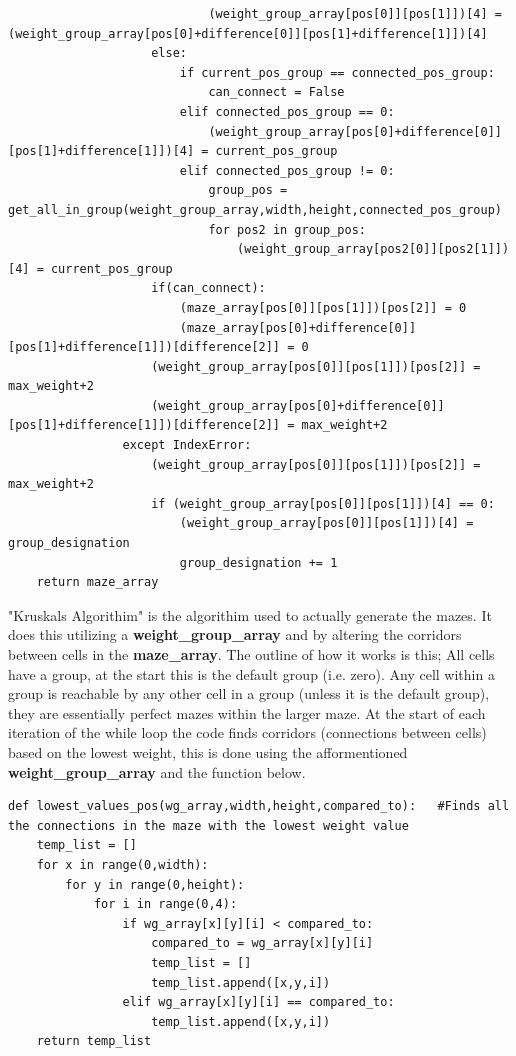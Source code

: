 \documentclass{article}
\begin{document}
\begin{lstlisting}
                            (weight_group_array[pos[0]][pos[1]])[4] = (weight_group_array[pos[0]+difference[0]][pos[1]+difference[1]])[4]
                    else:
                        if current_pos_group == connected_pos_group:
                            can_connect = False
                        elif connected_pos_group == 0:
                            (weight_group_array[pos[0]+difference[0]][pos[1]+difference[1]])[4] = current_pos_group
                        elif connected_pos_group != 0:
                            group_pos = get_all_in_group(weight_group_array,width,height,connected_pos_group)
                            for pos2 in group_pos:
                                (weight_group_array[pos2[0]][pos2[1]])[4] = current_pos_group
                    if(can_connect):
                        (maze_array[pos[0]][pos[1]])[pos[2]] = 0
                        (maze_array[pos[0]+difference[0]][pos[1]+difference[1]])[difference[2]] = 0
                    (weight_group_array[pos[0]][pos[1]])[pos[2]] = max_weight+2
                    (weight_group_array[pos[0]+difference[0]][pos[1]+difference[1]])[difference[2]] = max_weight+2
                except IndexError:
                    (weight_group_array[pos[0]][pos[1]])[pos[2]] = max_weight+2
                    if (weight_group_array[pos[0]][pos[1]])[4] == 0:
                        (weight_group_array[pos[0]][pos[1]])[4] = group_designation
                        group_designation += 1
    return maze_array
\end{lstlisting}
"Kruskals Algorithim" is the algorithim used to actually generate the mazes. It does this utilizing a \textbf{weight\_group\_array} and by altering
the corridors between cells in the \textbf{maze\_array}. The outline of how it works is this; All cells have a group, at the start this is the default group (i.e. zero).
Any cell within a group is reachable by any other cell in a group (unless it is the default group), they are essentially perfect mazes within the larger maze.
At the start of each iteration of the while loop the code finds corridors (connections between cells) based on the lowest weight, this is done using the afformentioned
\textbf{weight\_group\_array} and the function below.
\clearpage
\begin{lstlisting}
def lowest_values_pos(wg_array,width,height,compared_to):   #Finds all the connections in the maze with the lowest weight value
    temp_list = []
    for x in range(0,width):
        for y in range(0,height):
            for i in range(0,4):
                if wg_array[x][y][i] < compared_to:
                    compared_to = wg_array[x][y][i]
                    temp_list = []
                    temp_list.append([x,y,i])
                elif wg_array[x][y][i] == compared_to:
                    temp_list.append([x,y,i])
    return temp_list
\end{lstlisting}
\end{document}
